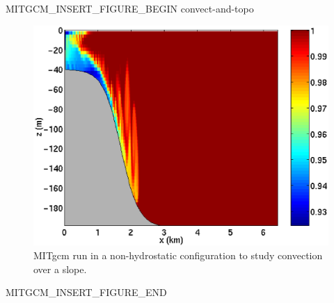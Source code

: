 \begin{rawhtml}MITGCM_INSERT_FIGURE_BEGIN convect-and-topo\end{rawhtml}
\begin{figure}
\begin{center}
  \includegraphics[width=\textwidth]{s_overview/figs/Tt4000.eps}
\end{center}
\caption{MITgcm run in a non-hydrostatic configuration
to study convection over a slope.}
\label{fig:convect-and-topo}
\end{figure}
\begin{rawhtml}MITGCM_INSERT_FIGURE_END\end{rawhtml}
